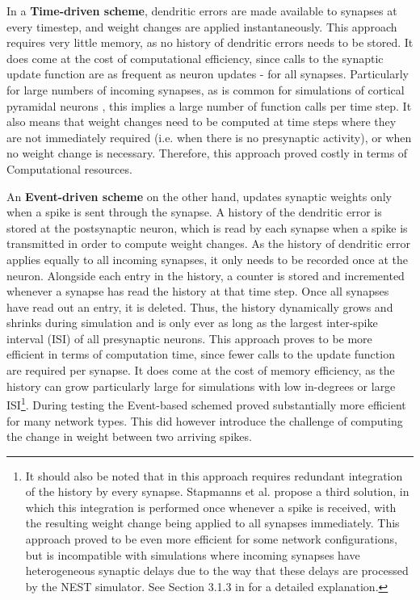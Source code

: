 In a \textbf{Time-driven scheme}, dendritic errors are made available to synapses at every timestep, and weight changes
are applied instantaneously. This approach requires very little memory, as no history of dendritic errors needs to be
stored. It does come at the cost of computational efficiency, since calls to the synaptic update function are as
frequent as neuron updates - for all synapses. Particularly for large numbers of incoming synapses, as is common for
simulations of cortical pyramidal neurons \citep{potjans2014cell,vezoli2004quantitative}, this implies a large number of
function calls per time step. It also means that weight changes need to be computed at time steps where they are not
immediately required (i.e. when there is no presynaptic activity), or when no weight change is necessary. Therefore,
this approach proved costly in terms of Computational resources.

An \textbf{Event-driven scheme} on the other hand, updates synaptic weights only when a spike is sent through the
synapse. A history of the dendritic error is stored at the postsynaptic neuron, which is read by each synapse when a
spike is transmitted in order to compute weight changes. As the history of dendritic error applies equally to all
incoming synapses, it only needs to be recorded once at the neuron. Alongside each entry in the history, a counter is
stored and incremented whenever a synapse has read the history at that time step. Once all synapses have read out an
entry, it is deleted. Thus, the history dynamically grows and shrinks during simulation and is only
ever as long as the largest inter-spike interval (ISI) of all presynaptic neurons. This approach proves to be more
efficient in terms of computation time, since fewer calls to the update function are required per synapse. It does come
at the cost of memory efficiency, as the history can grow particularly large for simulations with low in-degrees or
large ISI\footnote{It should also be noted that in this approach requires redundant integration of the history by every
synapse. Stapmanns et al. propose a third solution, in which this integration is performed once whenever a spike is
received, with the resulting weight change being applied to all synapses immediately. This approach proved to be even
more efficient for some network configurations, but is incompatible with simulations where incoming synapses have
heterogeneous synaptic delays due to the way that these delays are processed by the NEST simulator. See Section 3.1.3 in
\cite{Stapmanns2021} for a detailed explanation.}. During testing the Event-based schemed proved substantially more
 efficient for many network types. This did however introduce the challenge of computing the change in weight
 between two arriving spikes. \newline


